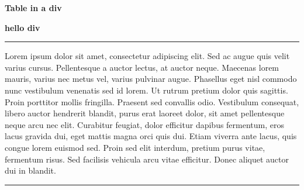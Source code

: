 \documentclass[
  8pt,
  a4paper,
  DIV=10]{scrreprt}
\renewcommand*\contentsname{Table des matières}
\newcommand\contentsname{Table des matières}
\begin{document}
\begin{titlepage}
\LARGE\textbf{Table in a div}

\large\textbf{hello div}

\vspace{1cm}


\par\rule{\textwidth}{0.5pt}

Lorem ipsum dolor sit amet, consectetur adipiscing elit. Sed ac augue
quis velit varius cursus. Pellentesque a auctor lectus, at auctor neque.
Maecenas lorem mauris, varius nec metus vel, varius pulvinar augue.
Phasellus eget nisl commodo nunc vestibulum venenatis sed id lorem. Ut
rutrum pretium dolor quis sagittis. Proin porttitor mollis fringilla.
Praesent sed convallis odio. Vestibulum consequat, libero auctor
hendrerit blandit, purus erat laoreet dolor, sit amet pellentesque neque
arcu nec elit. Curabitur feugiat, dolor efficitur dapibus fermentum,
eros lacus gravida dui, eget mattis magna orci quis dui. Etiam viverra
ante lacus, quis congue lorem euismod sed. Proin sed elit interdum,
pretium purus vitae, fermentum risus. Sed facilisis vehicula arcu vitae
efficitur. Donec aliquet auctor dui in blandit.

\par\rule{\textwidth}{0.5pt}


\vspace{1cm}

\begin{flushright}
\end{flushright}

\end{titlepage}\renewcommand*\contentsname{Table des matières}
{
\hypersetup{linkcolor=}
\setcounter{tocdepth}{0}
\tableofcontents
}
\begin{table}

\caption{\label{tbl-table1}}


\end{table}%
\end{document}
